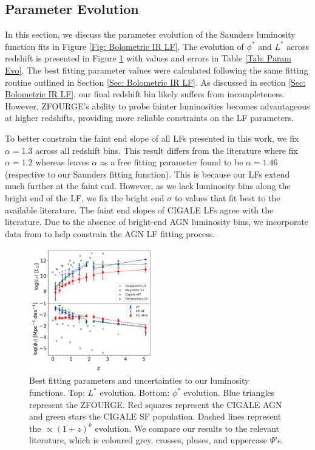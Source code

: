 \subsection{Parameter Evolution} \label{Sec: Parameter Evolution}
In this section, we discuss the parameter evolution of the Saunders luminosity function fits in Figure \ref{Fig: Bolometric IR LF}. The evolution of $\phi^{*}$ and $L^{*}$ across redshift is presented in Figure \ref{Fig: Param Evo} with values and errors in Table \ref{Tab: Param Evo}. The best fitting parameter values were calculated following the same fitting routine outlined in Section \ref{Sec: Bolometric IR LF}. As discussed in section \ref{Sec: Bolometric IR LF}, our final redshift bin likely suffers from incompleteness. However, ZFOURGE's ability to probe fainter luminosities becomes advantageous at higher redshifts, providing more reliable constraints on the LF parameters.

To better constrain the faint end slope of all LFs presented in this work, we fix $\alpha=1.3$ across all redshift bins. This result differs from the literature where \cite{rodighiero_mid-_2010, gruppioni_herschel_2013} fix $\alpha=1.2$ whereas \cite{fu_decomposing_2010} leaves $\alpha$ as a free fitting parameter found to be $\alpha=1.46$ (respective to our Saunders fitting function). This is because our LFs extend much further at the faint end. However, as we lack luminosity bins along the bright end of the LF, we fix the bright end $\sigma$ to values that fit best to the available literature. The faint end slopes of CIGALE LFs agree with the literature. Due to the absence of bright-end AGN luminosity bins, we incorporate data from \cite{thorne_deep_2022} to help constrain the AGN LF fitting process.

\begin{figure}[h]
    \centering
    \includegraphics[width=0.48\textwidth]{Figures/Param_Evo.png}
    \caption{Best fitting parameters and uncertainties to our luminosity functions. Top: $L^{*}$ evolution. Bottom: $\phi^{*}$ evolution. Blue triangles represent the ZFOURGE. Red squares represent the CIGALE AGN and green stars the CIGALE SF population. Dashed lines represent the $\propto(1+z)^k$ evolution. We compare our results to the relevant literature, which is coloured grey. \cite{gruppioni_herschel_2013} crosses, \cite{magnelli_deepest_2013} pluses, and \cite{caputi_infrared_2007} uppercase $\Psi$'s.}
    \label{Fig: Param Evo}
\end{figure}

